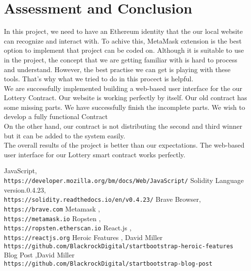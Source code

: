 \documentclass[]{scrreprt}
\begin{document}
\chapter{Assessment and Conclusion}
In this project, we need to have an Ethereum identity that the our local website can recognize and interact with. To achive this,  MetaMask extension is the best option to implement that project can be coded on. Although it is suitable to use in the project, the concept that we are getting familiar with is hard to process and understand. However, the best practise we can get is playing with these tools. That's why what we tried to do in this procect is helpful.\\
We are successfully implemented building a web-based user interface for the our Lottery Contract. Our website is working perfectly by itself. Our old contract has some missing parts. We have successfully finish the incomplete parts. We wish to develop a fully functional Contract \\
On the other hand, our contract is not distributing the second and third winner but it can be added to the system easily.\\
The overall results of the project is better than our expectations. The web-based user interface for our Lottery smart contract works perfectly.


\begin{appendices}


\end{appendices}

\begin{thebibliography}{9}

		JavaScript,
		\\\texttt{https://developer.mozilla.org/bm/docs/Web/JavaScript/}
		Solidity Language version.0.4.23,
		\\\texttt{https://solidity.readthedocs.io/en/v0.4.23/}
		Brave Browser,
		\\\texttt{https://brave.com}
		Metamask ,
		\\\texttt{https://metamask.io}
			Ropsten , 
			\\\texttt{https://ropsten.etherscan.io}
	React.js , 
	\\\texttt{https://reactjs.org}
	Heroic Features , David Miller
	\\\texttt{https://github.com/BlackrockDigital/startbootstrap-heroic-features}
	Blog Post ,David Miller 
	\\\texttt{https://github.com/BlackrockDigital/startbootstrap-blog-post}
			
		
\end{thebibliography}
\end{document}
